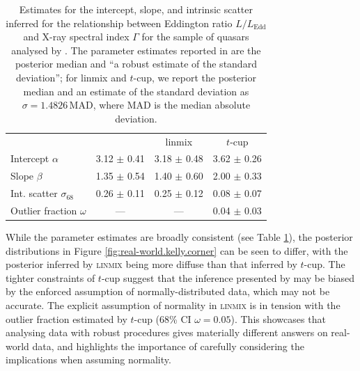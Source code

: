 \documentclass[fleqn,usenatbib]{rasti}
\begin{document}
\begin{table}
	\centering
	\caption{Estimates for the intercept, slope, and intrinsic scatter inferred for
	the relationship between Eddington ratio $L / L_{\text{Edd}}$ and X-ray
	spectral index $\Gamma$ for the sample of quasars analysed by
	\citet{Kelly:2007}. The parameter estimates reported in \citet{Kelly:2007} are
	the posterior median and ``a robust estimate of the standard deviation''; for
	linmix and $t$-cup, we report the posterior median and an estimate of the
	standard deviation as $\sigma = 1.4826 \, \text{MAD}$, where MAD is the median
	absolute deviation.}
	\label{tab:real-world.kelly.params}
	\begin{tabular}{lccc} %
                               & \citet{Kelly:2007} & linmix   & $t$-cup       \\
    Intercept $\alpha$         & 3.12 $\pm$ 0.41 & 3.18 $\pm$ 0.48 & 3.62 $\pm$ 0.26 \\
    Slope $\beta$              & 1.35 $\pm$ 0.54 & 1.40 $\pm$ 0.60 & 2.00 $\pm$ 0.33 \\
    Int. scatter $\sigma_{68}$ & 0.26 $\pm$ 0.11 & 0.25 $\pm$ 0.12 & 0.08 $\pm$ 0.07 \\
    Outlier fraction $\omega$  &      ---      &      ---      & 0.04 $\pm$ 0.03 \\
\end{tabular}
\end{table}

While the parameter estimates are broadly consistent (see Table
\ref{tab:real-world.kelly.params}), the posterior distributions in Figure
\ref{fig:real-world.kelly.corner} can be seen to differ, with the posterior
inferred by \textsc{linmix} being more diffuse than that inferred by $t$-cup.
The tighter constraints of $t$-cup suggest that the inference presented by
\citet{Kelly:2007} may be biased by the enforced assumption of
normally-distributed data, which may not be accurate. The explicit assumption of
normality in \textsc{linmix} is in tension with the outlier fraction estimated
by $t$-cup (68\% CI $\omega = 0.05$).
This showcases that analysing data with robust procedures gives materially
different answers on real-world data, and highlights the importance of carefully
considering the implications when assuming normality.
\end{document}
